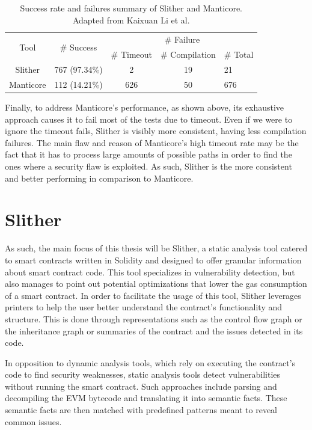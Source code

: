 \begin{table}
\centering
\begin{tabular}{ccccl}
\hline
\multirow{2}{*}{Tool} & \multirow{2}{*}{\# Success} & \multicolumn{3}{c}{\# Failure}         \\ \cline{3-5} 
                      &                             & \# Timeout & \# Compilation & \# Total \\ \hline
Slither               & 767 (97.34\%)               & 2          & 19             & 21       \\
Manticore             & 112 (14.21\%)               & 626        & 50             & 676      \\ \hline
\end{tabular}
\caption{Success rate and failures summary of Slither and Manticore. Adapted from Kaixuan Li et al.\cite{staticAnalysisToolsComparison}}
\label{tab:my-table2}
\end{table}

Finally, to address Manticore's performance, as shown above, its exhaustive approach causes it to fail most of the tests due to timeout. Even if we were to ignore the timeout fails, Slither is visibly more consistent, having less compilation failures. The main flaw and reason of Manticore's high timeout rate may be the fact that it has to process large amounts of possible paths in order to find the ones where a security flaw is exploited. As such, Slither is the more consistent and better performing in comparison to Manticore.

\section{Slither}

As such, the main focus of this thesis will be Slither\cite{slither}, a static analysis tool catered to smart contracts written in Solidity and designed to offer granular information about smart contract code. This tool specializes in vulnerability detection, but also manages to point out potential optimizations that lower the gas consumption of a smart contract. In order to facilitate the usage of this tool, Slither leverages printers to help the user better understand the contract’s functionality and structure. This is done through representations such as the control flow graph or the inheritance graph or summaries of the contract and the issues detected in its code. 

In opposition to dynamic analysis\cite{dynamicAnalysis} tools, which rely on executing the contract’s code to find security weaknesses, static analysis tools detect vulnerabilities without running the smart contract. Such approaches include parsing and decompiling the EVM bytecode and translating it into semantic facts. These semantic facts are then matched with predefined patterns meant to reveal common issues.

